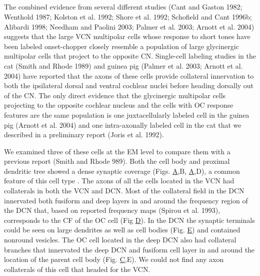 \documentclass[10pt,a4paper]{article}
\begin{document}
\subsection{\citep{SmithMassieEtAl:2005}}
The combined evidence from several
different studies (Cant and Gaston 1982; Wenthold 1987; Kolston et al. 1992;
Shore et al. 1992; Schofield and Cant 1996b; Alibardi 1998; Needham and Paolini
2003; Palmer et al. 2003; Arnott et al. 2004) suggests that the large VCN
multipolar cells whose response to short tones have been labeled onset-chopper
\citep[OC][]{RhodeOertelEtAl:1983a,SmithRhode:1989} closely resemble a population
of large glycinergic multipolar cells that project to the opposite
CN. Single-cell labeling studies in the cat (Smith and Rhode 1989) and guinea
pig (Palmer et al. 2003; Arnott et al. 2004) have reported that the axons of
these cells provide collateral innervation to both the ipsilateral dorsal and
ventral cochlear nuclei before heading dorsally out of the CN. The only direct
evidence that the glycinergic multipolar cells projecting to the opposite
cochlear nucleus and the cells with OC response features are the same population
is one juxtacellularly labeled cell in the guinea pig (Arnott et al. 2004) and
one intra-axonally labeled cell in the cat that we described in a preliminary
report (Joris et al. 1992).

We examined three of these cells at the EM level to compare them
with a previous report (Smith and Rhode 989).  Both the cell body and proximal
dendritic tree showed a dense synaptic coverage (Figs.
\href{www3.interscience.wiley.com.mate.lib.unimelb.edu.au/cgi-bin/fulltext/109873297/main.html,ftx_abs#FIG3}A,B,
\href{www3.interscience.wiley.com.mate.lib.unimelb.edu.au/cgi-bin/fulltext/109873297/main.html,ftx_abs#FIG4}A,D),
a common feature of this cell type \citep{SmithRhode:1989}.  The axons of all
the cells located in the VCN had collaterals in both the VCN and DCN. Most of
the collateral field in the DCN innervated both fusiform and deep layers in and
around the frequency region of the DCN that, based on reported frequency maps
(Spirou et al. 1993), corresponds to the CF of the OC cell (Fig
\href{www3.interscience.wiley.com.mate.lib.unimelb.edu.au/cgi-bin/fulltext/109873297/main.html,ftx_abs#FIG3}D).
In the DCN the synaptic terminals could be seen on large dendrites as well as
cell bodies
(Fig. \href{www3.interscience.wiley.com.mate.lib.unimelb.edu.au/cgi-bin/fulltext/109873297/main.html,ftx_abs#FIG3}E)
and contained nonround vesicles. The OC cell located in the deep DCN also had
collateral branches that innervated the deep DCN and fusiform cell layer in and
around the location of the parent cell body
(Fig. \href{www3.interscience.wiley.com.mate.lib.unimelb.edu.au/cgi-bin/fulltext/109873297/main.html,ftx_abs#FIG4}C,E).
We could not find any axon collaterals of this cell that headed for the VCN.
\end{document}
